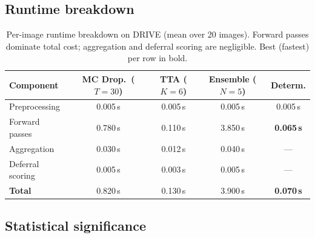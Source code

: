 \subsection{Runtime breakdown}

\begin{table}[H]
\centering
\caption{Per-image runtime breakdown on DRIVE (mean over 20 images).
Forward passes dominate total cost; aggregation and deferral scoring are
negligible. Best (fastest) per row in bold.}
\label{tab:runtime}
\scriptsize
\setlength{\tabcolsep}{3.5pt}
\renewcommand{\arraystretch}{1.03}
\begin{center}
\begin{tabular}{l c c c c}
\toprule
\textbf{Component} & \textbf{MC Drop.\ ($T{=}30$)} & \textbf{TTA ($K{=}6$)} &
\textbf{Ensemble ($N{=}5$)} & \textbf{Determ.} \\
\midrule
Preprocessing     & 0.005\,s & 0.005\,s & 0.005\,s & 0.005\,s \\
Forward passes    & 0.780\,s & 0.110\,s & 3.850\,s & \textbf{0.065\,s} \\
Aggregation       & 0.030\,s & 0.012\,s & 0.040\,s & ---      \\
Deferral scoring  & 0.005\,s & 0.003\,s & 0.005\,s & ---      \\
\midrule
\textbf{Total}    & 0.820\,s & 0.130\,s & 3.900\,s & \textbf{0.070\,s} \\
\bottomrule
\end{tabular}
\end{center}
\end{table}

\subsection{Statistical significance}


